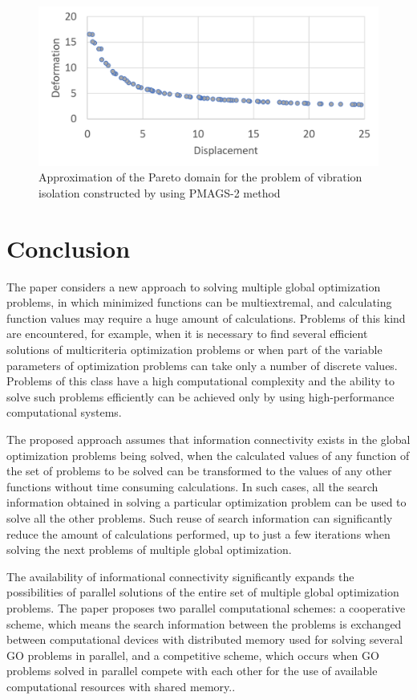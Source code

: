 \documentclass[review]{elsarticle}
\begin{document}
\begin{figure}
  \centering
  \includegraphics[width=0.7\linewidth]{fig6}
  \caption{Approximation of the Pareto domain for the problem of vibration isolation constructed by using PMAGS-2 method}
  \label{fig:6}
\end{figure}


\section{Conclusion}\label{sec:6}

The paper considers a new approach to solving multiple global optimization problems, in which minimized functions can be multiextremal, and calculating function values may require a huge amount of calculations. Problems of this kind are encountered, for example, when it is necessary to find several efficient solutions of multicriteria optimization problems or when part of the variable parameters of optimization problems can take only a number of discrete values. Problems of this class have a high computational complexity and the ability to solve such problems efficiently can be achieved only by using high-performance computational systems.

The proposed approach assumes that information connectivity exists in the global optimization problems being solved, when the calculated values of any function of the set of problems to be solved can be transformed to the values of any other functions without time consuming calculations. In such cases, all the search information obtained in solving a particular optimization problem can be used to solve all the other problems. Such reuse of search information can significantly reduce the amount of calculations performed, up to just a few iterations when solving the next problems of multiple global optimization.

The availability of informational connectivity significantly expands the possibilities of parallel solutions of the entire set of multiple global optimization problems. The paper proposes two parallel computational schemes: a cooperative scheme, which means the search information between the problems is exchanged between computational devices with distributed memory used for solving several GO problems in parallel, and a competitive scheme, which occurs when GO problems solved in parallel compete with each other for the use of available computational resources with shared memory..
\end{document}
